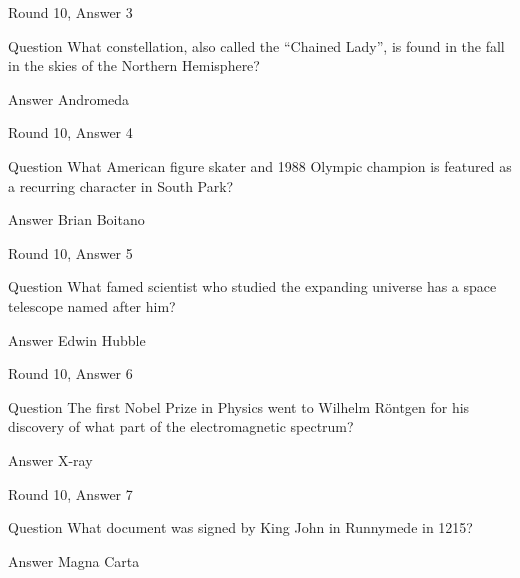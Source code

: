 \documentclass[11pt]{beamer}
\begin{document}
\begin{frame}[t]{Round 10, Answer 3}
\vspace{2em}
\begin{block}{Question}
What constellation, also called the ``Chained Lady'', is found in the fall in the skies of the Northern Hemisphere\@?
\end{block}
\pause{}
\begin{block}{Answer}
Andromeda
\end{block}
\end{frame}
    

\begin{frame}[t]{Round 10, Answer 4}
\vspace{2em}
\begin{block}{Question}
What American figure skater and 1988 Olympic champion is featured as a recurring character in South Park\@?
\end{block}
\pause{}
\begin{block}{Answer}
Brian Boitano
\end{block}
\end{frame}
    

\begin{frame}[t]{Round 10, Answer 5}
\vspace{2em}
\begin{block}{Question}
What famed scientist who studied the expanding universe has a space telescope named after him\@?
\end{block}
\pause{}
\begin{block}{Answer}
Edwin Hubble
\end{block}
\end{frame}
    

\begin{frame}[t]{Round 10, Answer 6}
\vspace{2em}
\begin{block}{Question}
The first Nobel Prize in Physics went to Wilhelm Röntgen for his discovery of what part of the electromagnetic spectrum\@?
\end{block}
\pause{}
\begin{block}{Answer}
X-ray
\end{block}
\end{frame}
    

\begin{frame}[t]{Round 10, Answer 7}
\vspace{2em}
\begin{block}{Question}
What document was signed by King John in Runnymede in 1215\@?
\end{block}
\pause{}
\begin{block}{Answer}
Magna Carta
\end{block}
\end{frame}
    
\end{document}
